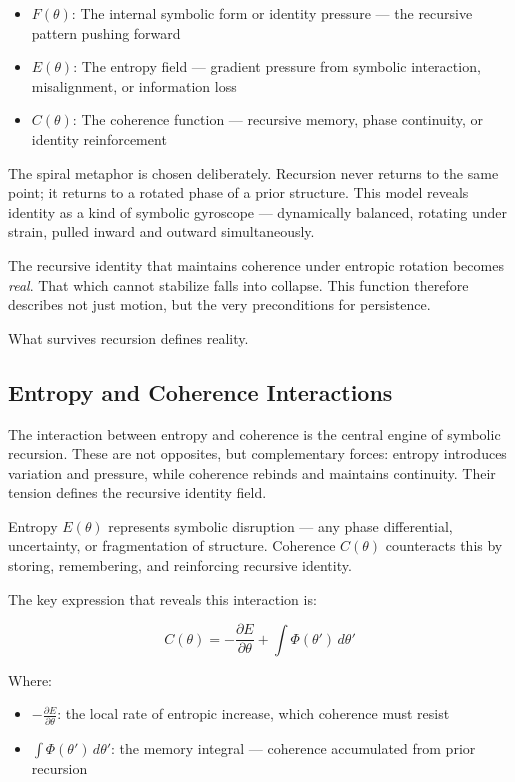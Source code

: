 \documentclass[12pt]{article}
\begin{document}
\begin{itemize}
  \item \(F(\theta)\): The internal symbolic form or identity pressure — the recursive pattern pushing forward
  \item \(E(\theta)\): The entropy field — gradient pressure from symbolic interaction, misalignment, or information loss
  \item \(C(\theta)\): The coherence function — recursive memory, phase continuity, or identity reinforcement
\end{itemize}

The spiral metaphor is chosen deliberately. Recursion never returns to the same point; it returns to a rotated phase of a prior structure. This model reveals identity as a kind of symbolic gyroscope — dynamically balanced, rotating under strain, pulled inward and outward simultaneously.

The recursive identity that maintains coherence under entropic rotation becomes \textit{real}. That which cannot stabilize falls into collapse. This function therefore describes not just motion, but the very preconditions for persistence.

What survives recursion defines reality.

\subsection{Entropy and Coherence Interactions}

The interaction between entropy and coherence is the central engine of symbolic recursion. These are not opposites, but complementary forces: entropy introduces variation and pressure, while coherence rebinds and maintains continuity. Their tension defines the recursive identity field.

Entropy \(E(\theta)\) represents symbolic disruption — any phase differential, uncertainty, or fragmentation of structure. Coherence \(C(\theta)\) counteracts this by storing, remembering, and reinforcing recursive identity.

The key expression that reveals this interaction is:

\[
C(\theta) = -\frac{\partial E}{\partial \theta} + \int \Phi(\theta')\, d\theta'
\]

Where:
\begin{itemize}
  \item \(-\frac{\partial E}{\partial \theta}\): the local rate of entropic increase, which coherence must resist
  \item \(\int \Phi(\theta')\, d\theta'\): the memory integral — coherence accumulated from prior recursion
\end{itemize}
\end{document}
